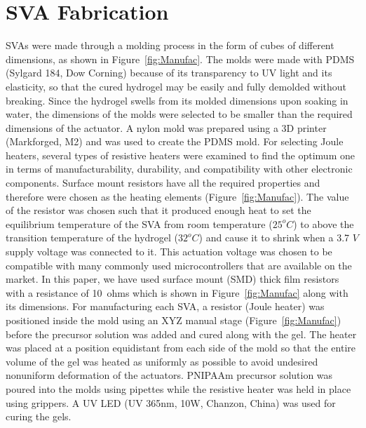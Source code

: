 \section{SVA Fabrication}
SVAs were made through a molding process in the form of cubes of different dimensions, as shown in Figure~\ref{fig:Manufac}. The molds were made with PDMS (Sylgard 184, Dow Corning) because of its transparency to UV light and its elasticity, so that the cured hydrogel may be easily and fully demolded without breaking. Since the hydrogel swells from its molded dimensions upon soaking in water, the dimensions of the molds were selected to be smaller than the required dimensions of the actuator. A nylon mold was prepared using a 3D printer (Markforged, M2) and was used to create the PDMS mold. For selecting Joule heaters, several types of resistive heaters were examined to find the optimum one in terms of manufacturability, durability, and compatibility with other electronic components. Surface mount resistors have all the required properties and therefore were chosen as the heating elements (Figure~\ref{fig:Manufac}). The value of the resistor was chosen such that it produced enough heat to set the equilibrium temperature of the SVA from room temperature ($25^{o}C$) to above the transition temperature of the hydrogel ($32^{o}C$) and cause it to shrink when a 3.7 $V$ supply voltage was connected to it. This actuation voltage was chosen to be compatible with many commonly used microcontrollers that are available on the market. In this paper, we have used surface mount 
(SMD) thick film resistors with a resistance of 10~ohms which is shown in Figure~\ref{fig:Manufac} along with its dimensions.  For manufacturing each SVA, a resistor (Joule heater) was positioned inside the mold using an XYZ manual stage (Figure~\ref{fig:Manufac}) before the precursor solution was added and cured along with the gel. The heater was placed at a position equidistant from each side of the mold so that the entire volume of the gel was heated as uniformly as possible to avoid undesired nonuniform deformation of the actuators. PNIPAAm precursor solution was poured into the molds using pipettes while the resistive heater was held in place using grippers. A UV LED (UV 365nm, 10W, Chanzon, China) was used for curing the gels. 

